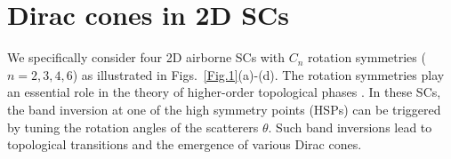 \documentclass[doublecol]{epl2}
\begin{document}

\section{Dirac cones in 2D SCs}

We specifically consider four 2D airborne SCs with  $C_n$ rotation symmetries ($n = 2, 3, 4, 6$) as illustrated in Figs.~\ref{Fig.1}(a)-(d). The rotation symmetries play an essential role in the theory of higher-order topological phases \cite{benalcazar2019quantization,van2018higher,song2017d,benalcazar2017electric,fang2019new}. In these SCs, the band inversion at one of the high symmetry points (HSPs) can be triggered by tuning the rotation angles of the scatterers $\theta$. Such band inversions lead to topological transitions and the emergence of various Dirac cones.
\end{document}

